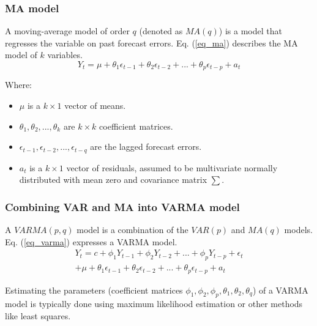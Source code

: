 \documentclass[conference]{IEEEtran}
\begin{document}
\subsubsection{MA model}\hfill\par
A moving-average model of order \(q\) (denoted as \(MA(q)\)) is a model that regresses the variable on past forecast errors. Eq. (\ref{eq_ma}) describes the MA model of \(k\) variables.
\begin{equation}\label{eq_ma}
    Y_t = \mu + \theta_1\epsilon_{t - 1} + \theta_2\epsilon_{t - 2} + ... + \theta_p\epsilon_{t - p} + a_t
\end{equation}\par
Where:\par
\begin{itemize}
    \item \(\mu\) is a \(k \times 1\) vector of means.
    \item \(\theta_1, \theta_2, ..., \theta_k\) are \(k \times k\) coefficient matrices.
    \item \(\epsilon_{t-1}, \epsilon_{t-2}, ..., \epsilon_{t-q}\) are the lagged forecast errors.
    \item \(a_t\) is a \(k \times 1\) vector of residuals, assumed to be multivariate normally distributed with mean zero and covariance matrix \(\sum\).
\end{itemize}
\subsubsection{Combining VAR and MA into VARMA model}\hfill\par
A \(VARMA(p, q)\) model is a combination of the \(VAR(p)\) and \(MA(q)\) models. Eq. (\ref{eq_varma}) expresses a VARMA model.
\begin{equation}\label{eq_varma}
    \begin{align}
        Y_t = c + \phi_1Y_{t - 1} + \phi_2Y_{t - 2} + ... + \phi_pY_{t - p} + \epsilon_t \\
    + \mu + \theta_1\epsilon_{t - 1} + \theta_2\epsilon_{t - 2} + ... + \theta_p\epsilon_{t - p} + a_t
    \end{align}
\end{equation}\par
Estimating the parameters (coefficient matrices \(\phi_1, \phi_2, \phi_p, \theta_1, \theta_2, \theta_q\)) of a VARMA model is typically done using maximum likelihood estimation or other methods like least squares.
\end{document}

